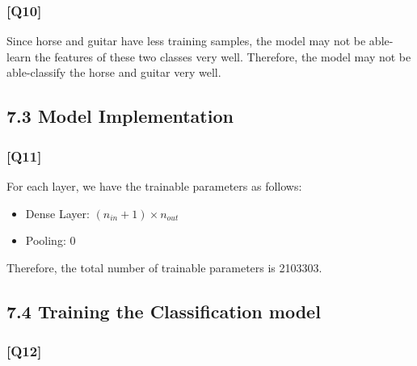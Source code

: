 \documentclass{article}
\begin{document}
\subsubsection*{[Q10]}
Since horse and guitar have less training samples, the model may not be able-learn the features of these two classes very well.
Therefore, the model may not be able-classify the horse and guitar very well.

\subsection*{7.3 Model Implementation}

\subsubsection*{[Q11]}

For each layer, we have the trainable parameters as follows:
\begin{itemize}
    \item Dense Layer: $(n_{in} + 1) \times n_{out}$
    \item Pooling: 0
\end{itemize}

Therefore, the total number of trainable parameters is 2103303.


\subsection*{7.4 Training the Classification model}

\subsubsection*{[Q12]}
\end{document}
